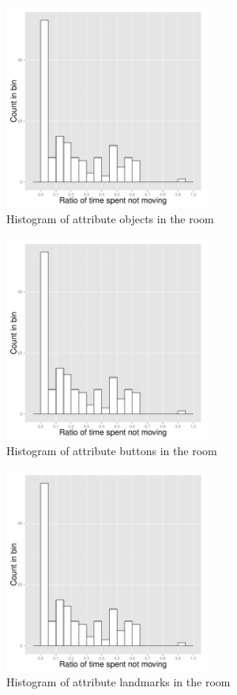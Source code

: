\begin{figure}[!htbp]
  \centering
	\includegraphics[page=3,width=0.6\textwidth]{Images/chains_features_ML}
	\caption{Histogram of attribute objects in the room}
	\label{fig:chains-distrib-objects}
\end{figure}

\begin{figure}[!htbp]
  \centering
	\includegraphics[page=4,width=0.6\textwidth]{Images/chains_features_ML}
	\caption{Histogram of attribute buttons in the room}
	\label{fig:chains-distrib-buttons}
\end{figure}

\begin{figure}[!htbp]
  \centering
	\includegraphics[page=5,width=0.6\textwidth]{Images/chains_features_ML}
	\caption{Histogram of attribute landmarks in the room}
	\label{fig:chains-distrib-landmarks}
\end{figure}

